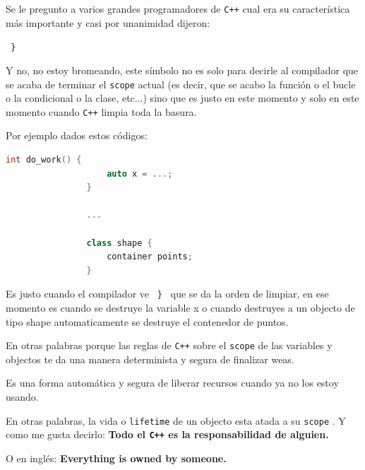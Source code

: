\documentclass[12pt, fleqn]{report}                             %
\theoremstyle{break}                                            %
\newcommand{\textCode}[1]  { \texttt{#1} }                      %
\newcommand{\Cpp}{\ignorespaces\textCode{C++}}                  %
\begin{document}
            Se le pregunto a varios grandes programadores de \Cpp cual era su
            característica más importante y casi por unanimidad dijeron:

            \textCode{ \} }

            Y no, no estoy bromeando, este símbolo no es solo para decirle al compilador
            que se acaba de terminar el \textCode{scope} actual (es decir, que se acabo 
            la función o el bucle o la condicional o la clase, etc...) sino que es justo
            en este momento y solo en este momento cuando \Cpp limpia toda la basura.

            Por ejemplo dados estos códigos:
            \begin{lstlisting}[language=C++, gobble=16]
                int do_work() {
                    auto x = ...;
                }

                ...

                class shape {
                    container points;
                }
            \end{lstlisting}

            Es justo cuando el compilador ve \textCode{ \} } que se da la orden de limpiar,
            en ese momento es cuando se destruye la variable x o cuando destruyes a un objecto
            de tipo shape automaticamente se destruye el contenedor de puntos.
            
            En otras palabras porque las reglas de \Cpp sobre el \textCode{scope} de las variables
            y objectos te da una manera determinista y segura de finalizar weas.

            Es una forma automática y segura de liberar recursos cuando ya no los estoy usando.

            En otras palabras, la vida o \textCode{lifetime} de un objecto esta atada a su \textCode{scope}.
            Y como me gusta decirlo:
            \textbf{
                Todo el \Cpp es la responsabilidad de alguien.
            }

            O en inglés:
            \textbf{
                Everything is owned by someone.
            }

            \cite{ModernCppWhatYouNeedToKnow}



        \clearpage
\end{document}
